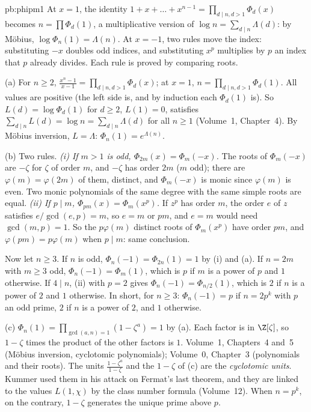 \begin{solution}{pb:phipm1}
\idea At $x=1$, the identity $1+x+\dots+x^{n-1}=\prod_{d\mid n,d>1}\Phi_d(x)$ becomes $n=\prod\Phi_d(1)$, a
multiplicative version of $\log n=\sum_{d\mid n}\Lambda(d)$: by Möbius, $\log\Phi_n(1)=\Lambda(n)$. At $x=-1$, two rules
move the index: substituting $-x$ doubles odd indices, and substituting $x^p$ multiplies by $p$ an index that $p$
already divides. Each rule is proved by comparing roots.

\writeup (a) For $n\ge2$, $\frac{x^n-1}{x-1}=\prod_{d\mid n,d>1}\Phi_d(x)$; at $x=1$, $n=\prod_{d\mid n,d>1}\Phi_d(1)$. All values
are positive (the left side is, and by induction each $\Phi_d(1)$ is). So $L(d)=\log\Phi_d(1)$ for $d\ge2$, $L(1)=0$,
satisfies $\sum_{d\mid n}L(d)=\log n=\sum_{d\mid n}\Lambda(d)$ for all $n\ge1$ (Volume~1, Chapter~4). By Möbius inversion, $L=\Lambda$:
$\Phi_n(1)=e^{\Lambda(n)}$.

(b) Two rules. \emph{(i) If $m>1$ is odd, $\Phi_{2m}(x)=\Phi_m(-x)$.} The roots of $\Phi_m(-x)$ are $-\zeta$ for $\zeta$ of order
$m$, and $-\zeta$ has order $2m$ ($m$ odd); there are $\varphi(m)=\varphi(2m)$ of them, distinct, and $\Phi_m(-x)$ is monic
since $\varphi(m)$ is even. Two monic polynomials of the same degree with the same simple roots are equal.
\emph{(ii) If $p\mid m$, $\Phi_{pm}(x)=\Phi_m(x^p)$.} If $z^p$ has order $m$, the order $e$ of $z$ satisfies
$e/\gcd(e,p)=m$, so $e=m$ or $pm$, and $e=m$ would need $\gcd(m,p)=1$. So the $p\varphi(m)$ distinct roots of $\Phi_m(x^p)$ have
order $pm$, and $\varphi(pm)=p\varphi(m)$ when $p\mid m$: same conclusion.

Now let $n\ge3$. If $n$ is odd, $\Phi_n(-1)=\Phi_{2n}(1)=1$ by (i) and (a). If $n=2m$ with $m\ge3$ odd,
$\Phi_n(-1)=\Phi_m(1)$, which is $p$ if $m$ is a power of $p$ and $1$ otherwise. If $4\mid n$, (ii) with $p=2$ gives
$\Phi_n(-1)=\Phi_{n/2}(1)$, which is $2$ if $n$ is a power of $2$ and $1$ otherwise. In short, for $n\ge3$:
$\Phi_n(-1)=p$ if $n=2p^k$ with $p$ an odd prime, $2$ if $n$ is a power of $2$, and $1$ otherwise.

(c) $\Phi_n(1)=\prod_{\gcd(a,n)=1}(1-\zeta^a)=1$ by (a). Each factor is in $\Z[\zeta]$, so $1-\zeta$ times the product of
the other factors is $1$.
\tools Volume~1, Chapters~4 and~5 (Möbius inversion, cyclotomic polynomials); Volume~0, Chapter~3 (polynomials and their roots).
\leads The units $\frac{1-\zeta^a}{1-\zeta}$ and the $1-\zeta$ of (c) are the \emph{cyclotomic units}. Kummer used them in
his attack on Fermat's last theorem, and they are linked to the values $L(1,\chi)$ by the class number formula (Volume~12).
When $n=p^k$, on the contrary, $1-\zeta$ generates the unique prime above $p$.
\end{solution}

